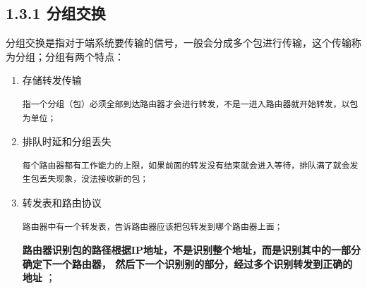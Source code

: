 \documentclass[11pt]{article}
\begin{document}
\subsection{1.3.1 分组交换}
\label{sec:org5aebd5f}
分组交换是指对于端系统要传输的信号，一般会分成多个包进行传输，这个传输称为分组；分组有两个特点：
\begin{enumerate}
\item 存储转发传输
\begin{verbatim}
指一个分组（包）必须全部到达路由器才会进行转发，不是一进入路由器就开始转发，以包为单位；
\end{verbatim}
\item 排队时延和分组丢失
\begin{verbatim}
每个路由器都有工作能力的上限，如果前面的转发没有结束就会进入等待，排队满了就会发生包丢失现象，没法接收新的包；
\end{verbatim}
\item 转发表和路由协议
\begin{verbatim}
路由器中有一个转发表，告诉路由器应该把包转发到哪个路由器上面；
\end{verbatim}

\textbf{路由器识别包的路径根据IP地址，不是识别整个地址，而是识别其中的一部分确定下一个路由器，
然后下一个识别别的部分，经过多个识别转发到正确的地址} ；
\end{enumerate}
\end{document}
